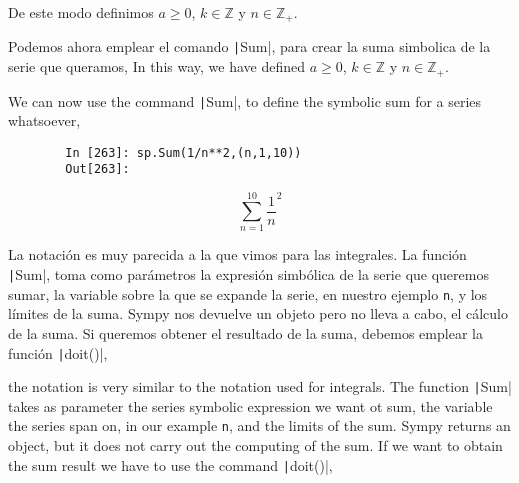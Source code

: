 \begin{paracol}{2}
De este modo definimos $a \ge 0$, $k \in \mathbb{Z}$ y $n \in \mathbb{Z}_+$.

Podemos ahora emplear el comando \texttt|Sum|, para crear la suma simbolica de la serie que queramos,
\switchcolumn
In this way, we have defined $a \ge 0$, $k \in \mathbb{Z}$ y $n \in \mathbb{Z}_+$.

We can now use the command \texttt|Sum|, to define the symbolic sum for a series whatsoever,
\end{paracol}
\begin{center}
	\begin{minipage}{.7\textwidth}
		\begin{verbatim}
		In [263]: sp.Sum(1/n**2,(n,1,10))
		Out[263]:	
		\end{verbatim}
		\begin{equation*}
			\sum_{n=1}^{10}\frac{1}{n}^2
		\end{equation*}
	\end{minipage}
\end{center}
\begin{paracol}{2}
La notación es muy parecida a la que vimos para las integrales. La función \texttt|Sum|, toma como parámetros la expresión simbólica de la serie que queremos sumar, la variable sobre la que se expande la serie, en nuestro ejemplo \texttt{n}, y los límites de la suma. Sympy nos devuelve un objeto pero no lleva a cabo, el cálculo de la suma. Si queremos obtener el resultado de la suma, debemos emplear la función \texttt|doit()|,

\switchcolumn
the notation is very similar to the notation used for integrals. The function \texttt|Sum| takes as parameter the series symbolic expression we want ot sum, the variable the series span on, in our example \texttt{n}, and the limits of the sum. Sympy returns an object, but it does not carry out the computing of the sum. If we want to obtain the sum result we have to use the command \texttt|doit()|,
\end{paracol}

